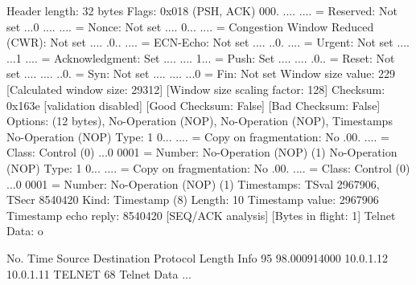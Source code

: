     Header length: 32 bytes
    Flags: 0x018 (PSH, ACK)
        000. .... .... = Reserved: Not set
        ...0 .... .... = Nonce: Not set
        .... 0... .... = Congestion Window Reduced (CWR): Not set
        .... .0.. .... = ECN-Echo: Not set
        .... ..0. .... = Urgent: Not set
        .... ...1 .... = Acknowledgment: Set
        .... .... 1... = Push: Set
        .... .... .0.. = Reset: Not set
        .... .... ..0. = Syn: Not set
        .... .... ...0 = Fin: Not set
    Window size value: 229
    [Calculated window size: 29312]
    [Window size scaling factor: 128]
    Checksum: 0x163e [validation disabled]
        [Good Checksum: False]
        [Bad Checksum: False]
    Options: (12 bytes), No-Operation (NOP), No-Operation (NOP), Timestamps
        No-Operation (NOP)
            Type: 1
                0... .... = Copy on fragmentation: No
                .00. .... = Class: Control (0)
                ...0 0001 = Number: No-Operation (NOP) (1)
        No-Operation (NOP)
            Type: 1
                0... .... = Copy on fragmentation: No
                .00. .... = Class: Control (0)
                ...0 0001 = Number: No-Operation (NOP) (1)
        Timestamps: TSval 2967906, TSecr 8540420
            Kind: Timestamp (8)
            Length: 10
            Timestamp value: 2967906
            Timestamp echo reply: 8540420
    [SEQ/ACK analysis]
        [Bytes in flight: 1]
Telnet
    Data: o

No.     Time           Source                Destination           Protocol Length Info
     95 98.000914000   10.0.1.12             10.0.1.11             TELNET   68     Telnet Data ...

